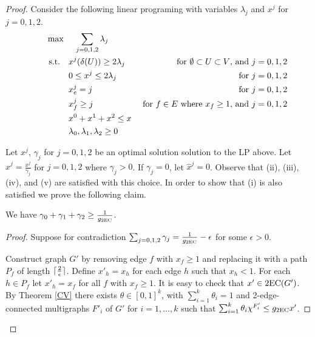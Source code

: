 \begin{proof}
	Consider the following linear programing with variables $\lambda_j$ and $x^j$ for $j=0,1,2$. 
	\begin{align}
	\quad\quad& \max\quad \;\sum_{j=0,1,2}\lambda_j\\
	&\;\text{s.t.} \quad x^j(\delta(U))\geq 2\lambda_j \;& \mbox{ for $\emptyset \subset U \subset V$, and $j=0,1,2$} \label{feasibility2ec}\\
	&\;{\color{white}{\text{s.t.}} }\quad 0 \leq x^j \leq 2\lambda_j\; &\mbox{ for $j=0,1,2$}\label{bound2ec}\\
	&\;{\color{white}{\text{s.t.}} }\quad x^j_e = j\; &\mbox{ for $j=0,1,2$}\label{branchcoordinate2ec}\\
	&\;{\color{white}{\text{s.t.}} }\quad x^j_f \geq j \; &\mbox{ for $f\in E$ where $x_f \geq 1$, and $j=0,1,2$}\label{1edges2ec}\\
	&\;{\color{white}{\text{s.t.}} }\quad x^0 + x^1+x^2 \leq x\label{packing2ec}\\
	&\;{\color{white}{\text{s.t.}} }\quad \lambda_0,\lambda_1,\lambda_2 \geq 0
	\end{align}
	
	Let $x^j$, $\gamma_j$ for $j=0,1,2$ be an optimal solution solution to the LP above. Let $\hat{x}^{j}=\frac{x^j}{\gamma_j}$ for $j=0,1,2$ where $\gamma_j>0$. If $\gamma_j=0$, let $\hat{x}^{j}=0$. Observe that  (ii), (iii), (iv), and (v) are satisfied with this choice. In order to show that (i) is also satisfied we prove the following claim.
	
	
	
	\begin{claim}\label{CVexists}
		We have $\gamma_0 + \gamma_1+\gamma_2\geq \frac{1}{g_{\operatorname{2EC}}}$.
	\end{claim}
	\begin{proof}
		Suppose for contradiction $\sum_{j=0,1,2}\gamma_j = \frac{1}{g_{\operatorname{2EC}}} - \epsilon$ for some $\epsilon >0$. 
		
		Construct graph $G'$ by removing edge $f$ with $x_f\geq 1$ and replacing it with a path $P_f$ of length $\lceil\frac{2}{\epsilon}\rceil$. Define $x'_h = x_h$ for each edge $h$ such that $x_h<1$. For each $h\in P_f$ let $x'_h= x_f$ for all $f$ with $x_f\geq 1$. It is easy to check that $x'\in \operatorname{2EC}(G')$. By Theorem \ref{CV} there exists $\theta \in [0,1]^k$, with $\sum_{i=1}^{k}\theta_i = 1$ and 2-edge-connected multigraphs $F'_i$ of $G'$ for $i=1,\ldots,k$ such that 
		$\sum_{i=1}^{k}\theta_i \chi^{F'_i}\leq g_{\operatorname{2EC}}x'$. 
		

\end{proof}
\end{proof}
